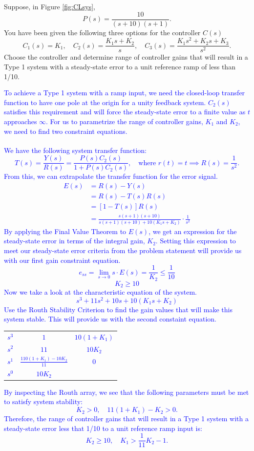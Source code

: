 \documentclass[10.5pt,letter]{exam}
\newcommand{\ans}[1]{\textcolor{blue}{#1}}
\begin{document}
\begin{questions}
\question[5] Suppose, in Figure \ref{fig:CLsys},
$$ P(s) = \frac{10}{(s+10)(s+1)} .$$
You have been given the following three options for the controller $C(s)$
$$C_1(s) = K_1, \quad C_2(s) = \frac{K_1s+K_2}{s}, \quad C_3(s) = \frac{K_1s^2+K_2s+K_3}{s^2}.$$
Choose the controller and determine range of controller gains that will result in a Type 1 system with a steady-state error to a unit reference ramp of less than 1/10.\\
\ans{To achieve a Type 1 system with a ramp input, we need the closed-loop transfer function to have one pole at the origin for a unity feedback system. $C_2(s)$ satisfies this requirement and will force the steady-state error to a finite value as $t$ approaches $\infty$. For us to parametrize the range of controller gains, $K_1$ and $K_2$, we need to find two constraint equations.\\\\
We have the following system transfer function: $$T(s) = \frac{Y(s)}{R(s)} = \frac{P(s)C_2(s)}{1 + P(s)C_2(s)}, \quad \text{where } r(t) = t \implies R(s) = \frac{1}{s^2}.$$ From this, we can extrapolate the transfer function for the error signal.
\begin{align*}
    E(s) &= R(s) - Y(s)\\
    &= R(s) - T(s)R(s)\\
    &= \left[1 - T(s)\right]R(s)\\
    &= \frac{s(s+1)(s+10)}{s(s+1)(s+10) + 10(K_1s + K_2)} \cdot \frac{1}{s^2}
\end{align*}
By applying the Final Value Theorem to $E(s)$, we get an expression for the steady-state error in terms of the integral gain, $K_2$. Setting this expression to meet our steady-state error criteria from the problem statement will provide us with our first gain constraint equation. $$e_{ss} = \lim_{s \to 0} s \cdot E(s) = \frac{1}{K_2} \leq \frac{1}{10}$$ $$K_2 \geq 10$$ Now we take a look at the characteristic equation of the system. $$s^3 + 11s^2 + 10s + 10(K_1s + K_2)$$ Use the Routh Stability Criterion to find the gain values that will make this system stable. This will provide us with the second constaint equation.
\begin{center}
    \begin{tabular}{ c|c c } 
        $s^3$ & $1$                           & $10(1+K_1)$\\ 
        $s^2$ & $11$                          & $10K_2$    \\ 
        $s^1$ & $\frac{110(1+K_1)-10K_2}{11}$ & 0          \\
        $s^0$ & $10K_2$                       &            \\
    \end{tabular}
\end{center}
By inspecting the Routh array, we see that the following parameters must be met to satisfy system stability: $$K_2 > 0, \quad 11(1+K_1) - K_2 > 0.$$ Therefore, the range of controller gains that will result in a Type 1 system with a steady-state error less that 1/10 to a unit reference ramp input is: $$K_2 \geq 10, \quad K_1 > \frac{1}{11}K_2 - 1.$$
}



\end{questions}
\end{document}
